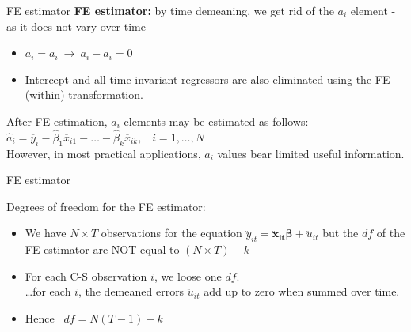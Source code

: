 \documentclass[usenames,dvipsnames]{beamer}
\begin{document}
\begin{frame}{FE estimator}
\textbf{FE estimator:} by time demeaning, we get rid of the $a_i$ element - as it does not vary over time 
\vspace{0.5cm}
\begin{itemize}
\item $a_i = \overline{a}_i \ \rightarrow \ a_i - \overline{a}_i = 0$
\item Intercept and all time-invariant regressors are also eliminated using the FE (within) transformation.
\end{itemize}
\vspace{0.5cm}
After FE estimation, $a_i$ elements may be estimated as follows:
$\hat{a}_i =\overline{y}_i - \hat{\beta}_1 \overline{x}_{i1} - \dots - \hat{\beta}_k \overline{x}_{ik},$ \ $i = 1, \dots, N$ \\
\vspace{0.5cm}
However, in most practical applications, $a_i$ values bear limited useful information.\\
\end{frame}
\begin{frame}{FE estimator}

Degrees of freedom for the FE estimator:
\begin{itemize}
\vspace{0.5cm}
\item We have $N \times T$ observations for the equation $\ddot{y}_{it} = \bm{\ddot{x}_{it} \beta} + \ddot{u}_{it}$ but the $df$ of the FE estimator are NOT equal to $(N \times T) - k$
\vspace{0.5cm}
\item For each C-S observation $i$, we loose one $df$.\\
\dots for each $i$, the demeaned errors $\ddot{u}_{it}$ add up to zero when summed over time. 
\item Hence \ $df = N(T-1)-k$
\end{itemize}
\end{frame}
\end{document}
